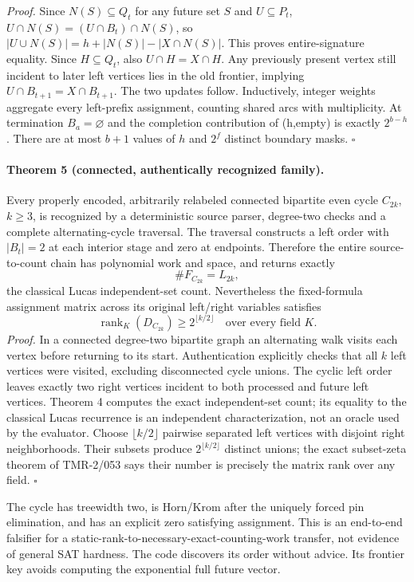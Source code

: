 \documentclass[11pt]{article}
\begin{document}
\emph{Proof.} Since $N(S)\subseteq Q_t$ for any future set $S$ and $U\subseteq P_t$,
$U\cap N(S)=(U\cap B_t)\cap N(S)$, so
$|U\cup N(S)|=h+|N(S)|-|X\cap N(S)|$.
This proves entire-signature equality. Since $H\subseteq Q_t$, also $U\cap H=X\cap H$. Any previously present vertex still incident to later left vertices lies in the old frontier, implying $U\cap B_{t+1}=X\cap B_{t+1}$. The two updates follow. Inductively, integer weights aggregate every left-prefix assignment, counting shared arcs with multiplicity. At termination $B_a=\varnothing$ and the completion contribution of (h,empty) is exactly $2^{b-h}$. There are at most $b+1$ values of $h$ and $2^f$ distinct boundary masks. \hfill$\square$

\paragraph{Theorem 5 (connected, authentically recognized family).}
Every properly encoded, arbitrarily relabeled connected bipartite even cycle $C_{2k}$, $k\ge3$, is recognized by a deterministic source parser, degree-two checks and a complete alternating-cycle traversal. The traversal constructs a left order with $|B_t|=2$ at each interior stage and zero at endpoints. Therefore the entire source-to-count chain has polynomial work and space, and returns exactly
\[
\#F_{C_{2k}}=L_{2k},
\]
the classical Lucas independent-set count. Nevertheless the fixed-formula assignment matrix across its original left/right variables satisfies
\[
\operatorname{rank}_K(D_{C_{2k}})\ge2^{\lfloor k/2\rfloor}
\quad\text{over every field }K.
\]
\emph{Proof.} In a connected degree-two bipartite graph an alternating walk visits each vertex before returning to its start. Authentication explicitly checks that all $k$ left vertices were visited, excluding disconnected cycle unions. The cyclic left order leaves exactly two right vertices incident to both processed and future left vertices. Theorem 4 computes the exact independent-set count; its equality to the classical Lucas recurrence is an independent characterization, not an oracle used by the evaluator. Choose $\lfloor k/2\rfloor$ pairwise separated left vertices with disjoint right neighborhoods. Their subsets produce $2^{\lfloor k/2\rfloor}$ distinct unions; the exact subset-zeta theorem of TMR-2/053 says their number is precisely the matrix rank over any field. \hfill$\square$

The cycle has treewidth two, is Horn/Krom after the uniquely forced pin elimination, and has an explicit zero satisfying assignment. This is an end-to-end falsifier for a static-rank-to-necessary-exact-counting-work transfer, not evidence of general SAT hardness. The code discovers its order without advice. Its frontier key avoids computing the exponential full future vector.
\end{document}
